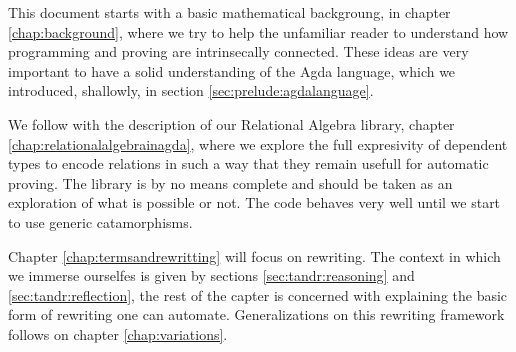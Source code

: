 This document starts with a basic mathematical backgroung, in chapter \ref{chap:background}, where we try to help the unfamiliar reader to understand
how programming and proving are intrinsecally connected. These ideas
are very important to have a solid understanding of the Agda language,
which we introduced, shallowly, in section \ref{sec:prelude:agdalanguage}.

We follow with the description of our Relational Algebra library, chapter \ref{chap:relationalalgebrainagda}, where we explore the full expresivity of 
dependent types to encode relations in such a way that they remain
usefull for automatic proving. The library is by no means complete and
should be taken as an exploration of what is possible or not. The code
behaves very well until we start to use generic catamorphisms.

Chapter \ref{chap:termsandrewritting} will focus on rewriting. The context
in which we immerse ourselfes is given by sections \ref{sec:tandr:reasoning} and
\ref{sec:tandr:reflection}, the rest of the capter is concerned with
explaining the basic form of rewriting one can automate. Generalizations
on this rewriting framework follows on chapter \ref{chap:variations}.


